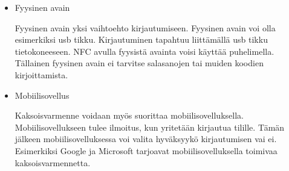 \begin{itemize}
    \item Fyysinen avain
    
    Fyysinen avain yksi vaihtoehto kirjautumiseen. Fyysinen avain voi olla esimerkiksi usb tikku. Kirjautuminen tapahtuu liittämällä usb tikku tietokoneeseen. NFC avulla fyysistä avainta voisi käyttää puhelimella. Tällainen fyysinen avain ei tarvitse salasanojen tai muiden koodien kirjoittamista.
    
    \item Mobiilisovellus
    
    Kaksoisvarmenne voidaan myös suorittaa mobiilisovelluksella. Mobiilisovellukseen tulee ilmoitus, kun yritetään kirjautua tilille. Tämän jälkeen mobiilisovelluksessa voi valita hyväksyykö kirjautumisen vai ei. Esimerkiksi Google ja Microsoft tarjoavat mobiilisovelluksella toimivaa kaksoisvarmennetta. 
\end{itemize}
